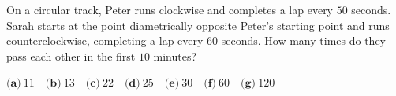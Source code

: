 On a circular track, Peter runs clockwise and completes a lap every $50$ seconds. Sarah starts at the point diametrically opposite Peter's starting point and runs counterclockwise, completing a lap every $60$ seconds. How many times do they pass each other in the first $10$ minutes?

$\textbf{(a)}\ 11\quad\textbf{(b)}\ 13\quad\textbf{(c)}\ 22\quad\textbf{(d)}\ 25\quad\textbf{(e)}\ 30\quad\textbf{(f)}\ 60\quad\textbf{(g)}\ 120$
